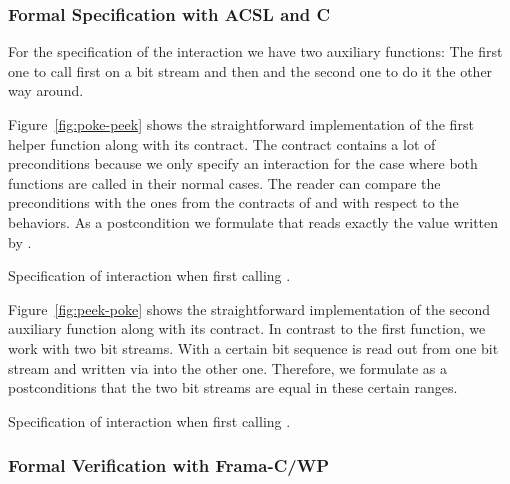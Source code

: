 \subsubsection{Formal Specification with ACSL and C}

For the specification of the interaction we have two auxiliary \isoc functions:
The first one to call first \poke on a bit stream and then \peek
and the second one to do it the other way around.

Figure~\ref{fig:poke-peek} shows the straightforward implementation 
of the first helper function along with its \acsl contract.
The contract contains a lot of preconditions because we
only specify an interaction for the case where both 
functions are called in their normal
cases. The reader can compare the preconditions with the ones from
the contracts of \peek and \poke with respect to the  behaviors.
As a postcondition we formulate that \peek reads exactly the value
written by \poke.

\begin{listing}[hbt]
\begin{minipage}{\textwidth}

\end{minipage}
\caption{\label{fig:poke-peek} Specification of interaction when first calling \poke.}
\end{listing}

Figure~\ref{fig:peek-poke} shows the straightforward implementation 
of the second auxiliary function along with its \acsl contract.
In contrast to the first function, we work with two bit streams.
With \peek a certain bit sequence is read out from one bit stream
and written via \poke into the other one.
Therefore, we formulate as a postconditions that
the two bit streams are equal in these certain ranges.

\begin{listing}[hbt]
\begin{minipage}{\textwidth}

\end{minipage}
\caption{\label{fig:peek-poke} Specification of interaction when first calling \peek.}
\end{listing}

 \FloatBarrier

\subsubsection{Formal Verification with Frama-C/WP}


